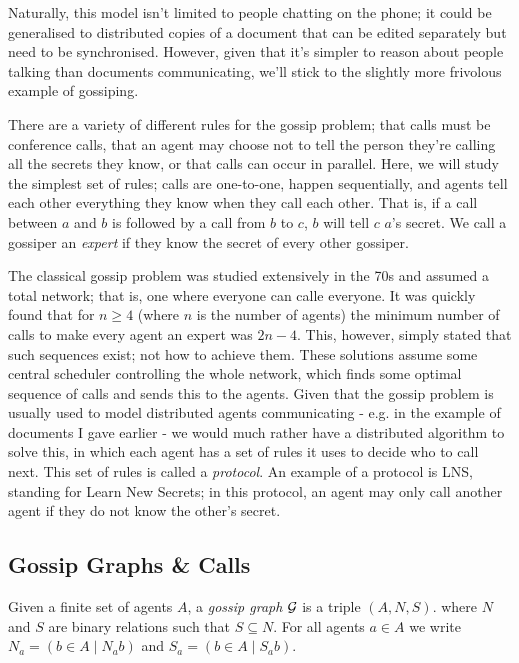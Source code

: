 \documentclass[12pt, a4paper]{article} %
\begin{document}
Naturally, this model isn't limited to people chatting on the phone; it could be generalised to distributed copies of a document that can be edited separately but need to be synchronised. However, given that it's simpler to reason about people talking than documents communicating, we'll stick to the slightly more frivolous example of gossiping.

There are a variety of different rules for the gossip problem; that calls must be conference calls, that an agent may choose not to tell the person they're calling all the secrets they know, or that calls can occur in parallel. Here, we will study the simplest set of rules; calls are one-to-one, happen sequentially, and agents tell each other everything they know when they call each other. That is, if a call between $a$ and $b$ is followed by a call from $b$ to $c$, $b$ will tell $c$ $a$'s secret. We call a gossiper an \textit{expert} if they know the secret of every other gossiper.

The classical gossip problem was studied extensively in the 70s and assumed a total network; that is, one where everyone can calle everyone. It was quickly found that for $n \geqslant 4$ (where $n$ is the number of agents) the minimum number of calls to make every agent an expert was $2n - 4$. This, however, simply stated that such sequences exist; not how to achieve them. These solutions assume some central scheduler controlling the whole network, which finds some optimal sequence of calls and sends this to the agents. Given that the gossip problem is usually used to model distributed agents communicating - e.g. in the example of documents I gave earlier - we would much rather have a distributed algorithm to solve this, in which each agent has a set of rules it uses to decide who to call next. This set of rules is called a \textit{protocol}. An example of a protocol is \textsf{LNS}, standing for Learn New Secrets; in this protocol, an agent may only call another agent if they do not know the other's secret.

\subsection{Gossip Graphs \& Calls}
\label{subsec:ggandcalls}

Given a finite set of agents $A$, a \textit{gossip graph} $\mathcal{G}$ is a triple $(A, N, S)$. where $N$ and $S$ are binary relations such that $S \subseteq N$. For all agents $a \in A$ we write $N_a = \left(b \in A \mid N_a b\right)$ and $S_a = \left(b \in A \mid S_a b\right)$.
\end{document}
